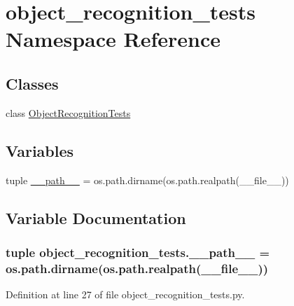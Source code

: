 \hypertarget{namespaceobject__recognition__tests}{\section{object\-\_\-recognition\-\_\-tests Namespace Reference}
\label{namespaceobject__recognition__tests}
}
\subsection*{Classes}
\begin{DoxyCompactItemize}
\item 
class \hyperlink{classobject__recognition__tests_1_1ObjectRecognitionTests}{Object\-Recognition\-Tests}
\end{DoxyCompactItemize}
\subsection*{Variables}
\begin{DoxyCompactItemize}
\item 
tuple \hyperlink{namespaceobject__recognition__tests_a79d7b0ae39325a5eefdffb4e9b57deff}{\-\_\-\-\_\-path\-\_\-\-\_\-} = os.\-path.\-dirname(os.\-path.\-realpath(\-\_\-\-\_\-file\-\_\-\-\_\-))
\end{DoxyCompactItemize}


\subsection{Variable Documentation}
\hypertarget{namespaceobject__recognition__tests_a79d7b0ae39325a5eefdffb4e9b57deff}{
\subsubsection[{\-\_\-\-\_\-path\-\_\-\-\_\-}]{\setlength{\rightskip}{0pt plus 5cm}tuple object\-\_\-recognition\-\_\-tests.\-\_\-\-\_\-path\-\_\-\-\_\- = os.\-path.\-dirname(os.\-path.\-realpath(\-\_\-\-\_\-file\-\_\-\-\_\-))}}\label{namespaceobject__recognition__tests_a79d7b0ae39325a5eefdffb4e9b57deff}


Definition at line 27 of file object\-\_\-recognition\-\_\-tests.\-py.

